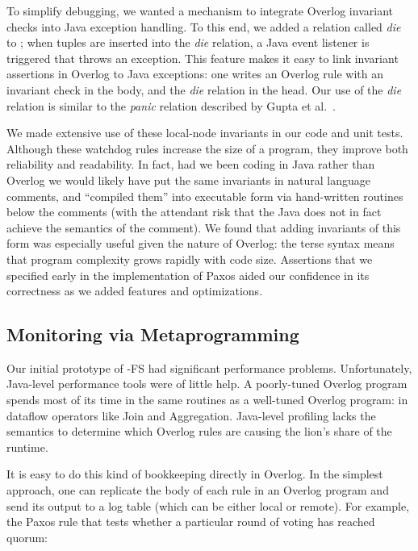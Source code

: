 To simplify debugging, we wanted a mechanism to integrate Overlog invariant
checks into Java exception handling.  To this end, we added a relation called
\emph{die} to \JOL; when tuples are inserted into the \emph{die} relation, a Java
event listener is triggered that throws an exception.  This feature makes it
easy to link invariant assertions in Overlog to Java exceptions: one writes an
Overlog rule with an invariant check in the body, and the \emph{die} relation in
the head. Our use of the \emph{die} relation is similar to the \emph{panic}
relation described by Gupta et al.~\cite{panic}.



We made extensive use of these local-node invariants in our code and unit tests.
Although these watchdog rules increase the size of a program, they improve both
reliability and readability.  In fact, had we been coding in Java rather than
Overlog we would likely have put the same invariants in natural language
comments, and ``compiled them'' into executable form via hand-written routines
below the comments (with the attendant risk that the Java does not in fact
achieve the semantics of the comment).  We found that adding invariants of this
form was especially useful given the nature of Overlog: the terse syntax means
that program complexity grows rapidly with code size.  Assertions that we
specified early in the implementation of Paxos aided our confidence in its
correctness as we added features and optimizations.

\subsection{Monitoring via Metaprogramming}
\label{sec:monitor}
Our initial prototype of \BOOM-FS had significant performance problems.
Unfortunately, Java-level performance tools were of little help. A poorly-tuned
Overlog program spends most of its time in the same routines as a well-tuned
Overlog program: in dataflow operators like Join and Aggregation.  Java-level
profiling lacks the semantics to determine which Overlog rules are causing the
lion's share of the runtime.

It is easy to do this kind of bookkeeping directly in
Overlog.  In the simplest approach, one can replicate the body of each
rule in an Overlog program and send its output to a log table (which
can be either local or remote). For example, the Paxos rule that tests
whether a particular round of voting has reached quorum:

